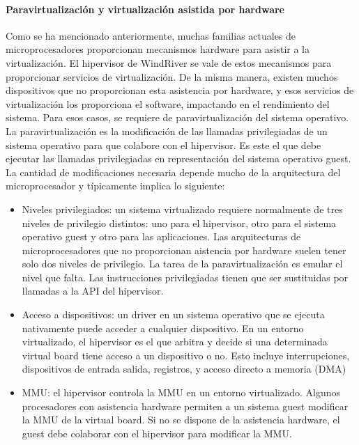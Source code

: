 \paragraph{Paravirtualización y virtualización asistida por hardware}
Como se ha mencionado anteriormente, muchas familias actuales de microprocesadores proporcionan mecanismos hardware para asistir a la virtualización. El hipervisor de WindRiver se vale de estos mecanismos para proporcionar servicios de virtualización. De la misma manera, existen muchos dispositivos que no proporcionan esta asistencia por hardware, y esos servicios de virtualización los proporciona el software, impactando en el rendimiento del sistema. Para esos casos, se requiere de paravirtualización del sistema operativo.\\
La paravirtualización es la modificación de las llamadas privilegiadas de un sistema operativo para que colabore con el hipervisor. Es este el que debe ejecutar las llamadas privilegiadas en representación del sistema operativo guest. La cantidad de modificaciones necesaria depende mucho de la arquitectura del microprocesador y típicamente implica lo siguiente:

\begin{itemize}
  \item Niveles privilegiados: un sistema virtualizado requiere normalmente de tres niveles de privilegio distintos: uno para el hipervisor, otro para el sistema operativo guest y otro para las aplicaciones. Las arquitecturas de microprocesadores que no proporcionan aistencia por hardware suelen tener solo dos niveles de privilegio. La tarea de la paravirtualización es emular el nivel que falta. Las instrucciones privilegiadas tienen que ser sustituidas por llamadas a la API del hipervisor.
  \item Acceso a dispositivos: un driver en un sistema operativo que se ejecuta nativamente puede acceder a cualquier dispositivo. En un entorno virtualizado, el hipervisor es el que arbitra y decide si una determinada virtual board tiene acceso a un dispositivo o no. Esto incluye interrupciones, dispositivos de entrada salida, registros, y acceso directo a memoria (DMA)
  \item \acrshort{MMU}: el hipervisor controla la \acrshort{MMU} en un entorno virtualizado. Algunos procesadores con asistencia hardware permiten a un sistema guest modificar la \acrshort{MMU} de la virtual board. Si no se dispone de la asistencia hardware, el guest debe colaborar con el hipervisor para modificar la \acrshort{MMU}.
\end{itemize}

